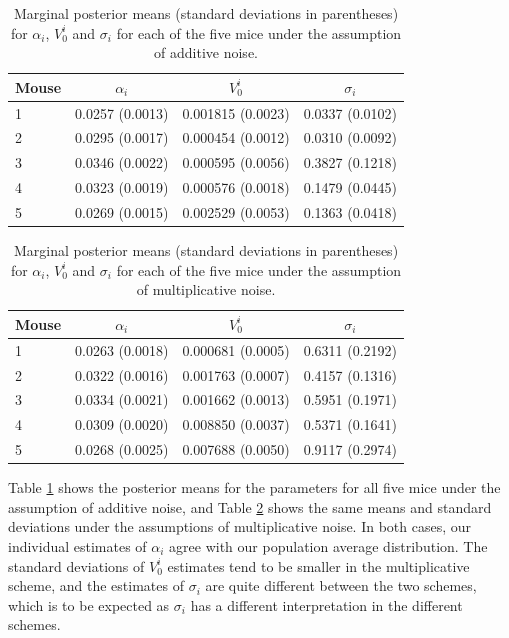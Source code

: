 \documentclass[11pt,a4paper]{article}
\begin{document}
\begin{table}
\centering
\begin{tabular}[c]{|l|c c c|}
\hline
Mouse & $\alpha_i$ & $V_0^i$ & $\sigma_i$ \\
\hline
1 & 0.0257 (0.0013) & 0.001815 (0.0023) & 0.0337 (0.0102) \\
2 & 0.0295 (0.0017) & 0.000454 (0.0012) & 0.0310 (0.0092) \\
3 & 0.0346 (0.0022) & 0.000595 (0.0056) & 0.3827 (0.1218) \\
4 & 0.0323 (0.0019) & 0.000576 (0.0018) & 0.1479 (0.0445) \\
5 & 0.0269 (0.0015) & 0.002529 (0.0053) & 0.1363 (0.0418) \\
\hline
\end{tabular} 
\caption{Marginal posterior means (standard deviations in parentheses) for $\alpha_i$, $V_0^i$ and $\sigma_i$ for each of the five mice under the assumption of additive noise.}
\label{tab:summaryAdd}
\end{table}
\begin{table}
\centering
\begin{tabular}[c]{|l|c c c|}
\hline
Mouse & $\alpha_i$ & $V_0^i$ & $\sigma_i$ \\
\hline
1 & 0.0263 (0.0018) & 0.000681 (0.0005) & 0.6311 (0.2192) \\
2 & 0.0322 (0.0016) & 0.001763 (0.0007) & 0.4157 (0.1316) \\
3 & 0.0334 (0.0021) & 0.001662 (0.0013) & 0.5951 (0.1971) \\
4 & 0.0309 (0.0020) & 0.008850 (0.0037) & 0.5371 (0.1641) \\
5 & 0.0268 (0.0025) & 0.007688 (0.0050) & 0.9117 (0.2974) \\
\hline
\end{tabular} 
\caption{Marginal posterior means (standard deviations in parentheses) for $\alpha_i$, $V_0^i$ and $\sigma_i$ for each of the five mice under the assumption of multiplicative noise.}
\label{tab:summaryMult}
\end{table}
Table \ref{tab:summaryAdd} shows the posterior means for the parameters for all five mice under the assumption of additive noise, and Table \ref{tab:summaryMult} shows the same means and standard deviations under the assumptions of multiplicative noise. In both cases, our individual estimates of $\alpha_i$ agree with our population average distribution. The standard deviations of $V_0^i$ estimates tend to be smaller in the multiplicative scheme, and the estimates of $\sigma_i$ are quite different between the two schemes, which is to be expected as $\sigma_i$ has a different interpretation in the different schemes.
\end{document}
